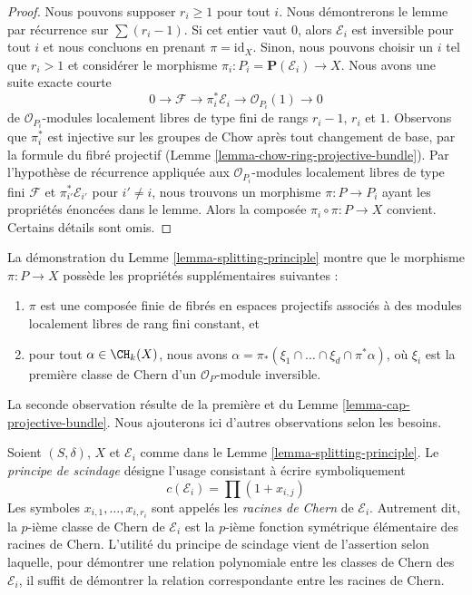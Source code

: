 \begin{proof}
Nous pouvons supposer $r_i \geq 1$ pour tout $i$. Nous démontrerons le lemme par récurrence
sur $\sum (r_i - 1)$. Si cet entier vaut $0$, alors $\mathcal{E}_i$
est inversible pour tout $i$ et nous concluons en prenant $\pi = \text{id}_X$.
Sinon, nous pouvons choisir un $i$ tel que $r_i > 1$ et considérer le
morphisme $\pi_i : P_i = \mathbf{P}(\mathcal{E}_i) \to X$.
Nous avons une suite exacte courte
$$
0 \to \mathcal{F} \to \pi_i^*\mathcal{E}_i \to \mathcal{O}_{P_i}(1) \to 0
$$
de $\mathcal{O}_{P_i}$-modules localement libres de type fini de rangs $r_i - 1$,
$r_i$ et $1$. Observons que $\pi_i^*$ est injective sur les groupes de Chow
après tout changement de base, par la formule du fibré projectif
(Lemme \ref{lemma-chow-ring-projective-bundle}).
Par l'hypothèse de récurrence appliquée aux
$\mathcal{O}_{P_i}$-modules localement libres de type fini $\mathcal{F}$ et $\pi_{i'}^*\mathcal{E}_{i'}$
pour $i' \not = i$, nous trouvons un morphisme $\pi : P \to P_i$ ayant
les propriétés énoncées dans le lemme. Alors la composée
$\pi_i \circ \pi : P \to X$ convient. Certains détails sont omis.
\end{proof}

\begin{remark}
\label{remark-the-proof-shows-more}
La démonstration du Lemme \ref{lemma-splitting-principle}
montre que le morphisme $\pi : P \to X$ possède les propriétés supplémentaires
suivantes :
\begin{enumerate}
\item $\pi$ est une composée finie de fibrés en espaces projectifs
associés à des modules localement libres de rang fini constant, et
\item pour tout $\alpha \in \CH_k(X)$, nous avons
$\alpha = \pi_*(\xi_1 \cap \ldots \cap \xi_d \cap \pi^*\alpha)$,
où $\xi_i$ est la première classe de Chern d'un
$\mathcal{O}_P$-module inversible.
\end{enumerate}
La seconde observation résulte de la première et du
Lemme \ref{lemma-cap-projective-bundle}.
Nous ajouterons ici d'autres observations selon les besoins.
\end{remark}

\noindent
Soient $(S, \delta)$, $X$ et $\mathcal{E}_i$ comme dans le
Lemme \ref{lemma-splitting-principle}.
Le {\it principe de scindage} désigne l'usage consistant à écrire symboliquement
$$
c(\mathcal{E}_i) = \prod (1 + x_{i, j})
$$
Les symboles $x_{i, 1}, \ldots, x_{i, r_i}$ sont appelés les {\it racines de Chern}
de $\mathcal{E}_i$. Autrement dit, la $p$-ième classe de Chern de $\mathcal{E}_i$
est la $p$-ième fonction symétrique élémentaire des racines de Chern.
L'utilité du principe de scindage vient de l'assertion selon laquelle,
pour démontrer une relation polynomiale entre les classes de Chern des
$\mathcal{E}_i$, il suffit de démontrer la relation correspondante entre les
racines de Chern.

